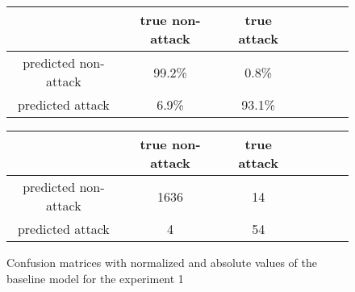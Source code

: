 \documentclass{article}
\begin{document}
\begin{figure}[h!]
    \centering
    \begin{tabular}{ |c|c|c|c|c|c|c| }
     \hline
      & true non-attack & true attack \\
     \hline
     predicted non-attack & 99.2\% & 0.8\% \\
     \hline
     predicted attack & 6.9\% & 93.1\% \\
     \hline
    \end{tabular}

    \vspace{0.2cm}

    \centering
    \begin{tabular}{ |c|c|c|c|c|c|c| }
     \hline
      & true non-attack & true attack \\
     \hline
     predicted non-attack & 1636 & 14 \\
     \hline
     predicted attack & 4 & 54 \\
     \hline
    \end{tabular}
    \caption{Confusion matrices with normalized and absolute values of the baseline model for the experiment 1}
    \label{fig-exp1-baseline}
\end{figure}


\end{document}
